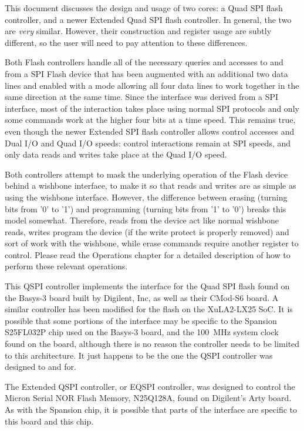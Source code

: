 \documentclass{gqtekspec}
\begin{document}
This document discusses the design and usage of two cores: a Quad SPI flash
controller, and a newer Extended Quad SPI flash controller.  In general, the
two are {\em very} similar.  However, their construction and register usage
are subtly different, so the user will need to pay attention to these
differences.

Both Flash controllers handle all of the necessary queries and accesses to
and from a SPI Flash device that has been augmented with an additional
two data lines and enabled with a mode allowing all four data lines to
work together in the same direction at the same time.  Since the interface
was derived from a SPI interface, most of the interaction takes place using
normal SPI protocols and only some commands work at the higher four bits
at a time speed.  This remains true, even though the newer Extended SPI flash
controller allows control accesses and Dual I/O and Quad I/O speeds: control
interactions remain at SPI speeds, and only data reads and writes take place
at the Quad I/O speed.

Both controllers attempt to mask the underlying operation of the
Flash device behind a wishbone interface, to make it so that reads and writes
are as simple as using the wishbone interface.  However, the difference
between erasing (turning bits from '0' to '1') and programming (turning bits
from '1' to '0') breaks this model somewhat.  Therefore, reads from the 
device act like normal wishbone reads, writes program the device (if the write
protect is properly removed) and sort of work with the wishbone, while erase
commands require another register to control.  Please read the Operations
chapter for a detailed description of how to perform these relevant operations.

This QSPI controller implements the interface for the Quad SPI flash found on
the Basys-3 board built by Digilent, Inc, as well as their CMod-S6 board.  A
similar controller has been modified for the flash on the XuLA2-LX25 SoC.  
It is possible that some portions of the interface may be specific to the
Spansion S25FL032P chip used on the Basys-3 board, and the
100~MHz system clock found on the board, although there is no reason the
controller needs to be limited to this architecture.  It just happens to be
the one the QSPI controller was designed to and for.

The Extended QSPI controller, or EQSPI controller, was designed to control the
Micron Serial NOR Flash Memory, N25Q128A, found on Digilent's Arty board.  As
with the Spansion chip, it is possible that parts of the interface are specific
to this board and this chip.
\end{document}
